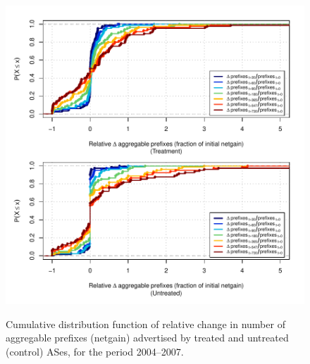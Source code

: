 \begin{figure}[H]
\begin{centering}
\begin{singlespace}
    \includegraphics[width=6in]{figures/behavior-rel_netgain-2004_2007-corr.pdf}
    \vspace{-2em}\\
    \caption{Cumulative distribution function of relative change in number of
    aggregable prefixes (netgain) advertised by treated and untreated (control)
    ASes, for the period 2004--2007.}
\end{singlespace}
\end{centering}
\end{figure}
